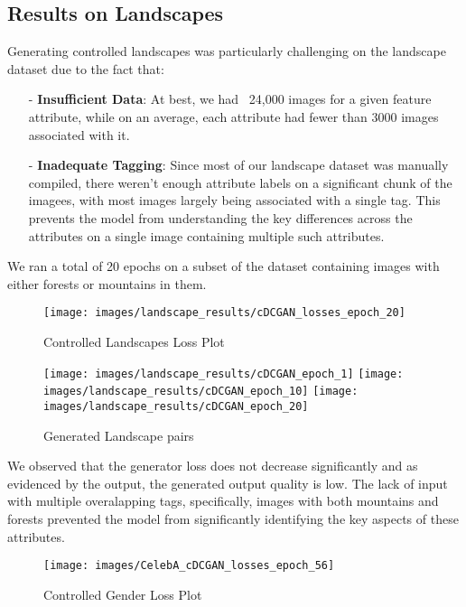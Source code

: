 \documentclass[twocolumn,10pt,cleanfoot]{asme2ej}
\begin{document}
\subsection{Results on Landscapes}
Generating controlled landscapes was particularly challenging on the landscape dataset due to the fact that:
\begin{itemize}
    \item[-] \textbf{Insufficient Data}: At best, we had ~24,000 images for a given feature attribute, while on an average, each attribute had fewer than 3000 images associated with it.
    \item[-] \textbf{Inadequate Tagging}: Since most of our landscape dataset was manually compiled, there weren't enough attribute labels on a significant chunk of the imagees, with most images largely being associated with a single tag. This prevents the model from understanding the key differences across the attributes on a single image containing multiple such attributes.
\end{itemize}

We ran a total of 20 epochs on a subset of the dataset containing images with either forests or mountains in them. 

\begin{figure}
\centerline{\texttt{[image: images/landscape\_results/cDCGAN\_losses\_epoch\_20]}}
\caption{Controlled Landscapes Loss Plot}
\label{landscapes_loss}
\end{figure}

\begin{figure*}
\texttt{[image: images/landscape\_results/cDCGAN\_epoch\_1]}
\texttt{[image: images/landscape\_results/cDCGAN\_epoch\_10]}
\texttt{[image: images/landscape\_results/cDCGAN\_epoch\_20]}
\caption{Generated Landscape pairs}
\label{landscape_res}
\end{figure*}

We observed that the generator loss does not decrease significantly and as evidenced by the output, the generated output quality is low. The lack of input with multiple overalapping tags, specifically, images with both mountains and forests prevented the model from significantly identifying the key aspects of these attributes.

\begin{figure}
\centerline{\texttt{[image: images/CelebA\_cDCGAN\_losses\_epoch\_56]}}
\caption{Controlled Gender Loss Plot}
\label{celeba_gender_loss}
\end{figure}
\end{document}
